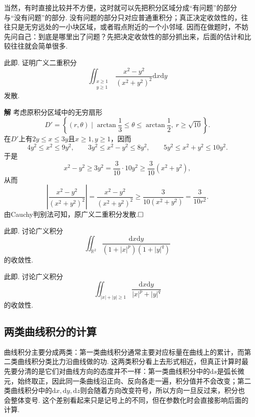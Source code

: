 \documentclass{ctexart}
\newenvironment{custom}[1]{\par\noindent \textbf{#1}\quad}{\par\vspace{1em}}
\begin{document}
当然，有时直接比较并不方便，这时就可以先把积分区域分成“有问题”的部分与“没有问题”的部分. 没有问题的部分只对应普通重积分；真正决定收敛性的，往往只是无穷远处的一小块区域，或者瑕点附近的一个小邻域. 因而在做题时，不妨先问自己：到底是哪里出了问题？先把决定收敛性的部分抓出来，后面的估计和比较往往就会简单很多.

\begin{example}
此即\cite[例题22.4.3]{XHM}. 证明广义二重积分
$$\iint_{\substack{x\geqslant 1\\ y\geqslant 1}}{\frac{x^{2}-y^{2}}{(x^{2}+y^{2})^{2}}\mathrm{d}x\mathrm{d}y}$$
发散.
\end{example}

\begin{custom}{解}
考虑原积分区域中的无穷扇形
$$D'=\left\{(r,\theta)\mid \arctan{\frac{1}{3}}\leqslant \theta\leqslant \arctan{\frac{1}{2}},\ r\geqslant \sqrt{10}\right\}.$$
在$D'$上有$2y\leqslant x\leqslant 3y$且$x\geqslant 1,y\geqslant 1$，因而
$$4y^{2}\leqslant x^{2}\leqslant 9y^{2},\qquad 3y^{2}\leqslant x^{2}-y^{2}\leqslant 8y^{2},\qquad 5y^{2}\leqslant x^{2}+y^{2}\leqslant 10y^{2}.$$
于是
$$x^{2}-y^{2}\geqslant 3y^{2}=\frac{3}{10}\cdot 10y^{2}\geqslant \frac{3}{10}(x^{2}+y^{2}),$$
从而
$$\left|\frac{x^{2}-y^{2}}{(x^{2}+y^{2})^{2}}\right|
=\frac{x^{2}-y^{2}}{(x^{2}+y^{2})^{2}}
\geqslant \frac{3}{10(x^{2}+y^{2})}
=\frac{3}{10r^{2}}.$$
由Cauchy判别法可知，原广义二重积分发散.$\hfill{\square}$
\end{custom}

\begin{exercise}
此即\cite[22.4.4练习题1(1)]{XHM}. 讨论广义积分
$$\iint_{\mathbb{R}^{2}}{\frac{\mathrm{d}x\mathrm{d}y}{(1+|x|^{p})(1+|y|^{q})}}$$
的收敛性.
\end{exercise}

\begin{exercise}
此即\cite[22.4.4练习题1(2)]{XHM}. 讨论广义积分
$$\iint_{|x|+|y|\geqslant 1}{\frac{\mathrm{d}x\mathrm{d}y}{|x|^{p}+|y|^{q}}}$$
的收敛性.
\end{exercise}


\subsection{两类曲线积分的计算}
曲线积分主要分成两类：第一类曲线积分通常主要对应标量在曲线上的累计，而第二类曲线积分类比力沿曲线做的功. 这两类积分看上去形式相近，但真正计算时最先要分清的是它们对曲线方向的态度并不一样：第一类曲线积分中的$\mathrm{d}s$是弧长微元，始终取正，因此同一条曲线沿正向、反向各走一遍，积分值并不会改变；第二类曲线积分中的$\mathrm{d}x,\mathrm{d}y,\mathrm{d}z$则会随着方向改变符号，所以方向一旦反过来，积分也会整体变号. 这个差别看起来只是记号上的不同，但在参数化时会直接影响后面的计算.
\end{document}
